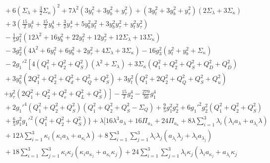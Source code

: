 \documentclass[preprint,amsmath,amssymb,aps,superscriptaddress,prd,
showpacs,floatfix,nofootinbib]{revtex4-1}
\begin{document}
\begin{subequations}
\begin{align}
\nonumber \\
& {} + 6 \left ( \Sigma_\lambda + \frac{3}{2} \Sigma_\kappa \right )^2 +
7 \lambda^2 \left ( 3 y_t^2 + 3 y_b^2 + y_\tau^2 \right ) + \left ( 3 y_t^2 +
3 y_b^2 + y_\tau^2 \right ) \left ( 2 \Sigma_\lambda + 3 \Sigma_\kappa
\right ) \nonumber \\
& {} + 3 \left ( \frac{15}{2} y_t^4 + \frac{15}{2} y_b^4 +
\frac{3}{2} y_\tau^4 + 5 y_b^2 y_t^2 + 3 y_b^2 y_\tau^2 + y_t^2 y_\tau^2
\right ) \nonumber \\
& {} - \frac{1}{5} g_1^2 \left ( 12 \lambda^2 + 16 y_b^2 + 22 y_t^2 +
12 y_\tau^2 + 12 \Sigma_\lambda + 13 \Sigma_\kappa \right ) \nonumber \\
& {} - 3 g_2^2 \left ( 4 \lambda^2 + 6 y_t^2 + 6 y_b^2 + 2 y_\tau^2 +
4 \Sigma_\lambda + 3 \Sigma_\kappa \right ) - 16 g_3^2 \left ( y_t^2 + y_b^2
+ \Sigma_\kappa \right ) \nonumber \\
& {} - 2 g_1'^2 \left [ 4 \left ( Q_1^2 + Q_2^2 + Q_S^2 \right )
\left ( \lambda^2 + \Sigma_\lambda \right ) + 3 \Sigma_\kappa \left ( Q_1^2 +
Q_2^2 + Q_S^2 + Q_D^2 + Q_{\overline{D}}^2 \right ) \right . \nonumber \\
& {} + 3 y_b^2 \left ( 2 Q_1^2 + Q_2^2 + Q_d^2 + Q_Q^2 + Q_S^2 \right ) +
3 y_t^2 \left ( Q_1^2 + 2 Q_2^2 + Q_Q^2 + Q_S^2 + Q_u^2 \right ) \nonumber \\
& {} \left . + y_\tau^2 \left ( 2 Q_1^2 + Q_2^2 + Q_e^2 + Q_L^2 + Q_S^2
\right ) \right ] - \frac{15}{2} g_2^4 - \frac{279}{50} g_1^4 \nonumber \\
& {} + 2 g_1'^4 \left ( Q_1^2 + Q_2^2 + Q_S^2 \right ) \left (Q_1^2 + Q_2^2
+ Q_S^2 - \Sigma_{Q} \right ) + \frac{9}{5} g_1^2 g_2^2 + 6 g_1'^2 g_2^2
\left ( Q_1^2 + Q_2^2 + Q_S^2 \right ) \nonumber \\
& {} + \frac{6}{5} g_1^2 g_1'^2 \left ( Q_1^2 + Q_2^2 + Q_S^2 \right )
\bigg \} + \lambda \bigg [ 16 \lambda^3 a_{\lambda} + 16\Pi_{a_\lambda} +
24 \Pi_{a_\kappa} + 8 \lambda \sum_{i=1}^3 \lambda_i \left ( \lambda_i
a_{\lambda} + a_{\lambda_i} \lambda \right ) \nonumber \\
& {} + 12 \lambda \sum_{i=1}^3 \kappa_i \left ( \kappa_i a_\lambda +
a_{\kappa_i} \lambda \right ) + 8 \sum_{i=1}^3 \sum_{j=1}^3 \lambda_i
\lambda_j \left ( a_{\lambda_i} \lambda_j + \lambda_i a_{\lambda_j} \right )
\nonumber \\
& {} + 18 \sum_{i=1}^3 \sum_{j=1}^3 \kappa_i \kappa_j \left ( \kappa_i
a_{\kappa_j} + a_{\kappa_i} \kappa_j \right ) + 24 \sum_{i=1}^3 \sum_{j=1}^3
\lambda_i \kappa_j \left ( \lambda_i a_{\kappa_j} + a_{\lambda_i} \kappa_j

\end{align}
\end{subequations}
\end{document}
